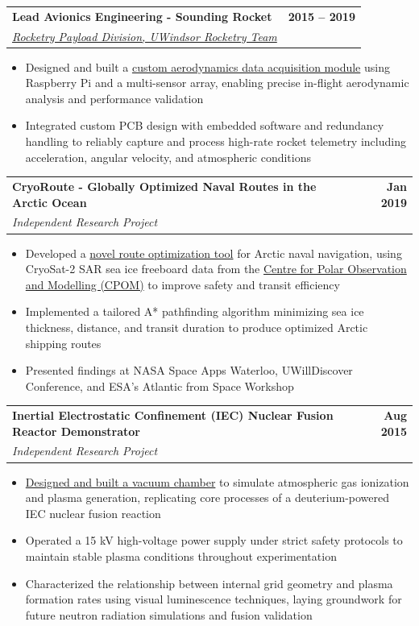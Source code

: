 \documentclass[letterpaper,11pt]{article}
\makeatletter
\newcommand{\resumeItem}[1]{
  \item\small{
    {#1 \vspace{-2pt}}
  }
}
\newcommand{\resumeSubheading}[4]{
  \vspace{-2pt}\item
    \begin{tabular*}{1.0\textwidth}[t]{l@{\extracolsep{\fill}}r}
      \textbf{#1} & \textbf{\small #2} \\
      \textit{\small#3} & \textit{\small #4} \\
    \end{tabular*}\vspace{-7pt}
}
\newcommand{\resumeItemListStart}{\begin{itemize}}
\newcommand{\resumeItemListEnd}{\end{itemize}\vspace{-5pt}}
\makeatother
\begin{document}
    \resumeSubheading
      {Lead Avionics Engineering - Sounding Rocket}{2015 -- 2019}
      {\href{https://atillasaadat.com/post/winsat-rocketry-division-data-acquisition-module/}{Rocketry Payload Division, UWindsor Rocketry Team}}{}
      \resumeItemListStart
        \resumeItem{Designed and built a \href{https://www.atillasaadat.com/post/winsat-rocketry-division-data-acquisition-module}{custom aerodynamics data acquisition module} using Raspberry Pi and a multi-sensor array, enabling precise in-flight aerodynamic analysis and performance validation}
        \resumeItem{Integrated custom PCB design with embedded software and redundancy handling to reliably capture and process high-rate rocket telemetry including acceleration, angular velocity, and atmospheric conditions}
      \resumeItemListEnd
    \resumeSubheading
      {CryoRoute - Globally Optimized Naval Routes in the Arctic Ocean}{Jan 2019}
      {Independent Research Project}{}
      \resumeItemListStart
        \resumeItem{Developed a \href{https://www.atillasaadat.com/post/cryoroute-globally-optimized-naval-routes-in-north-arctic-ocean}{novel route optimization tool} for Arctic naval navigation, using CryoSat-2 SAR sea ice freeboard data from the \href{https://www.cpom.ucl.ac.uk/group/}{Centre for Polar Observation and Modelling (CPOM)} to improve safety and transit efficiency}
        \resumeItem{Implemented a tailored A* pathfinding algorithm minimizing sea ice thickness, distance, and transit duration to produce optimized Arctic shipping routes}
        \resumeItem{Presented findings at NASA Space Apps Waterloo, UWillDiscover Conference, and ESA's Atlantic from Space Workshop}
      \resumeItemListEnd

    \resumeSubheading
      {Inertial Electrostatic Confinement (IEC) Nuclear Fusion Reactor Demonstrator}{Aug 2015}
      {Independent Research Project}{}
      \resumeItemListStart
        \resumeItem{\href{https://www.atillasaadat.com/post/demo-inertial-electrostatic-confinement-nuclear-fusion-reactor}{Designed and built a vacuum chamber} to simulate atmospheric gas ionization and plasma generation, replicating core processes of a deuterium-powered IEC nuclear fusion reaction}
        \resumeItem{Operated a 15 kV high-voltage power supply under strict safety protocols to maintain stable plasma conditions throughout experimentation}
        \resumeItem{Characterized the relationship between internal grid geometry and plasma formation rates using visual luminescence techniques, laying groundwork for future neutron radiation simulations and fusion validation}
      \resumeItemListEnd
\end{document}
